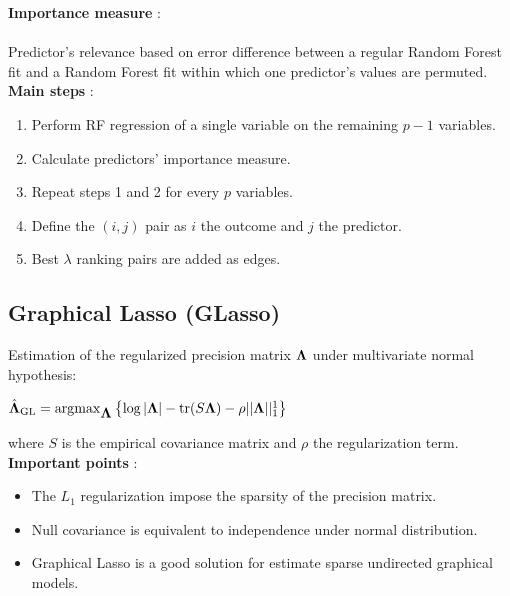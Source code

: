 \documentclass[landscape,a0paper,fontscale=0.285]{postertemplate} %
\newcommand{\compresslist}{ %
\setlength{\itemsep}{1pt}
\setlength{\parskip}{0pt}
\setlength{\parsep}{0pt}
}
\newcommand{\bfLambda}{\mbox{\boldmath$\Lambda$}}
\DeclareMathOperator*{\argmax}{\arg\!\max}
\begin{document}
\begin{poster}
{\textbf{Importance measure} :\\  \\
Predictor's relevance based on error difference between a regular Random Forest fit and a Random Forest fit within which one predictor's values are permuted.\\

\textbf{Main steps} : 
\begin{enumerate}\compresslist
\item Perform RF regression of a single variable on the remaining $p-1$ variables.
\item Calculate predictors' importance measure.
\item Repeat steps 1 and 2 for every $p$ variables.
\item Define the $(i,j) $ pair as $i$ the outcome and $j$ the predictor.
\item Best $\lambda$ ranking pairs are added as edges.
\end{enumerate}


\vspace{0 cm}
\subsection*{Graphical Lasso (GLasso)}

Estimation of the regularized precision matrix $\bfLambda$  under multivariate normal hypothesis:

\begin{center}
	$\hat{\bfLambda}_{\text{GL}} = \argmax_{\bfLambda} \left\{ \log |\bfLambda| - \text{tr}(S \bfLambda) - \rho || \bfLambda||_{1}^{1} \right\} \ $
\end{center}
where $S$ is the empirical covariance matrix and $\rho$  the regularization term. \\

\textbf{Important points} : 


\begin{itemize}\compresslist
	\item The $L_{1}$ regularization impose the sparsity of the precision matrix.
	\item Null covariance is equivalent to independence under normal distribution.
	\item Graphical Lasso is a good solution for estimate sparse undirected graphical models.
\end{itemize}



\vspace{0em} %
}



\end{poster}
\end{document}
